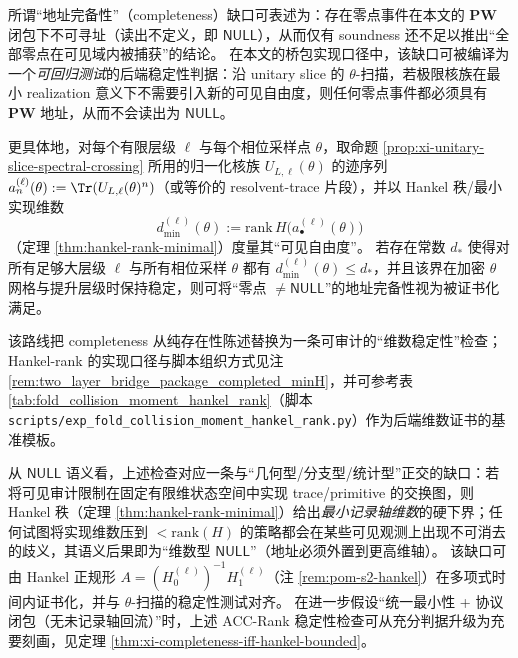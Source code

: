 \begin{remark}\label{rem:xi-acc-rank}
所谓“地址完备性”（completeness）缺口可表述为：存在零点事件在本文的 \(\mathbf{PW}\) 闭包下不可寻址（读出不定义，即 \(\mathsf{NULL}\)），从而仅有 soundness 还不足以推出“全部零点在可见域内被捕获”的结论。
在本文的桥包实现口径中，该缺口可被编译为一个\emph{可回归测试}的后端稳定性判据：沿 unitary slice 的 \(\theta\)-扫描，若极限核族在最小 realization 意义下不需要引入新的可见自由度，则任何零点事件都必须具有 \(\mathbf{PW}\) 地址，从而不会读出为 \(\mathsf{NULL}\)。
\par
更具体地，对每个有限层级 \(\ell\) 与每个相位采样点 \(\theta\)，取命题 \ref{prop:xi-unitary-slice-spectral-crossing} 所用的归一化核族 \(U_{L,\ell}(\theta)\) 的迹序列
\(
a^{(\ell)}_n(\theta):=\Tr(U_{L,\ell}(\theta)^n)
\)（或等价的 resolvent-trace 片段），并以 Hankel 秩/最小实现维数
\[
d^{(\ell)}_{\min}(\theta):=\mathrm{rank}\,H\!\bigl(a^{(\ell)}_\bullet(\theta)\bigr)
\]
（定理 \ref{thm:hankel-rank-minimal}）度量其“可见自由度”。
若存在常数 \(d_\ast\) 使得对所有足够大层级 \(\ell\) 与所有相位采样 \(\theta\) 都有 \(d^{(\ell)}_{\min}(\theta)\le d_\ast\)，并且该界在加密 \(\theta\) 网格与提升层级时保持稳定，则可将“零点 \(\neq\mathsf{NULL}\)”的地址完备性视为被证书化满足。
\par
该路线把 completeness 从纯存在性陈述替换为一条可审计的“维数稳定性”检查；Hankel-rank 的实现口径与脚本组织方式见注 \ref{rem:two_layer_bridge_package_completed_minH}，并可参考表 \ref{tab:fold_collision_moment_hankel_rank}（脚本 \texttt{scripts/exp\_fold\_collision\_moment\_hankel\_rank.py}）作为后端维数证书的基准模板。
\par
从 \(\mathsf{NULL}\) 语义看，上述检查对应一条与“几何型/分支型/统计型”正交的缺口：若将可见审计限制在固定有限维状态空间中实现 trace/primitive 的交换图，则 Hankel 秩（定理 \ref{thm:hankel-rank-minimal}）给出\emph{最小记录轴维数}的硬下界；任何试图将实现维数压到 \(<\mathrm{rank}(H)\) 的策略都会在某些可见观测上出现不可消去的歧义，其语义后果即为“维数型 \(\mathsf{NULL}\)”（地址必须外置到更高维轴）。
该缺口可由 Hankel 正规形 \(A=(H_0^{(\ell)})^{-1}H_1^{(\ell)}\)（注 \ref{rem:pom-s2-hankel}）在多项式时间内证书化，并与 \(\theta\)-扫描的稳定性测试对齐。
在进一步假设“统一最小性 + 协议闭包（无未记录轴回流）”时，上述 ACC-Rank 稳定性检查可从充分判据升级为充要刻画，见定理 \ref{thm:xi-completeness-iff-hankel-bounded}。
\end{remark}

